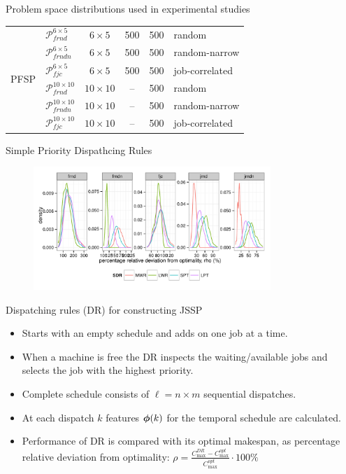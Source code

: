 \documentclass[xcolor=pdftex,t,11pt,handout]{beamer}
\begin{document}
{\begin{block}{Problem space distributions used in experimental studies}
\begin{table}
{\begin{tabular}{|l|l|c|c|c|l|}
\multirow{6}{*}{PFSP}
&$\mathcal{P}_{frnd}^{6\times5}$ &$6\times5$& 500&500& random \\ 
&$\mathcal{P}_{frndn}^{6\times5}$&$6\times5$& 500&500& random-narrow \\ 
&$\mathcal{P}_{fjc}^{6\times5}$  &$6\times5$& 500&500& job-correlated \\ 
&$\mathcal{P}_{frnd}^{10\times10}$ &$10\times10$&--&500&random \\ 
&$\mathcal{P}_{frndn}^{10\times10}$&$10\times10$&--&500& random-narrow \\ 
&$\mathcal{P}_{fjc}^{10\times10}$  &$10\times10$&--&500& job-correlated \\ 
\hline
\end{tabular}
}
\end{table}

\end{block}
\framebreak
\begin{block}{Simple Priority Dispathcing Rules}
\begin{figure} \centering 
\includegraphics[width=0.8\textwidth]{figures/SDR10x10color}
\end{figure}
\end{block}

\begin{block}{Dispatching rules (DR) for constructing JSSP}
\begin{itemize}
	\item Starts with an empty schedule and adds on one job at a time. 
	\item When a machine is free the DR inspects the waiting/available jobs and selects the job with the \alert{highest priority}. 
	\item Complete schedule consists of $\ell=n\times m$ sequential dispatches.
	\item At each dispatch $k$ features ${\boldsymbol{\phi}}(k)$ for the temporal schedule are calculated.
	\item Performance of DR is compared with its optimal makespan, as percentage relative deviation from optimality: $\rho=\frac{C_{\max}^{DR}-C_{\max}^{opt}}{C_{\max}^{opt}}\cdot 100\%$
\end{itemize}
\end{block}

}
\end{document}
